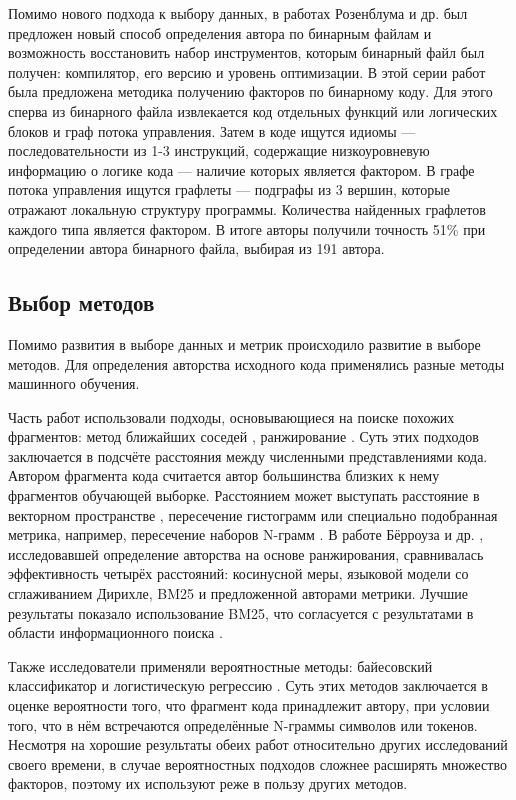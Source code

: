 Помимо нового подхода к выбору данных, в работах Розенблума и др. \cite{Rosenblum2010,Rosenblum2011,Rosenblum2011-2} был предложен новый способ определения автора по бинарным файлам и возможность восстановить набор инструментов, которым бинарный файл был получен: компилятор, его версию и уровень оптимизации. В этой серии работ была предложена методика получению факторов по бинарному коду. Для этого сперва из бинарного файла извлекается код отдельных функций или логических блоков и граф потока управления. Затем в коде ищутся идиомы — последовательности из 1-3 инструкций, содержащие низкоуровневую информацию о логике кода — наличие которых является фактором. В графе потока управления ищутся графлеты — подграфы из 3 вершин, которые отражают локальную структуру программы.  Количества найденных графлетов каждого типа является фактором. В итоге авторы получили точность 51\% при определении автора бинарного файла, выбирая из 191 автора.

\subsection{Выбор методов}

Помимо развития в выборе данных и метрик происходило развитие в выборе методов. Для определения авторства исходного кода применялись разные методы машинного обучения.

Часть работ использовали подходы, основывающиеся на поиске похожих фрагментов: метод ближайших соседей \cite{Keselj2003, Lange2007, Frantzeskou2006}, ранжирование \cite{Burrows2007, Shevertalov2009}. Суть этих подходов заключается в подсчёте расстояния между численными представлениями кода. Автором фрагмента кода считается автор большинства близких к нему фрагментов обучающей выборке. Расстоянием может выступать расстояние в векторном пространстве \cite{Shevertalov2009}, пересечение гистограмм \cite{Lange2007} или специально подобранная метрика, например, пересечение наборов N-грамм \cite{Frantzeskou2006,Frantzeskou2007}. В работе Бёрроуза и др. \cite{Burrows2007}, исследовавшей определение авторства на основе ранжирования, сравнивалась эффективность четырёх расстояний: косинусной меры, языковой модели со сглаживанием Дирихле, BM25 и предложенной авторами метрики. Лучшие результаты показало использование BM25, что согласуется с результатами в области информационного поиска \cite{Robertson2009}.

Также исследователи применяли вероятностные методы: байесовский классификатор \cite{Kothari2007} и логистическую регрессию \cite{Bandara2013}. Суть этих методов заключается в оценке вероятности того, что фрагмент кода принадлежит автору, при условии того, что в нём встречаются определённые N-граммы символов или токенов. Несмотря на хорошие результаты обеих работ относительно других исследований своего времени, в случае вероятностных подходов сложнее расширять множество факторов, поэтому их используют реже в пользу других методов.

